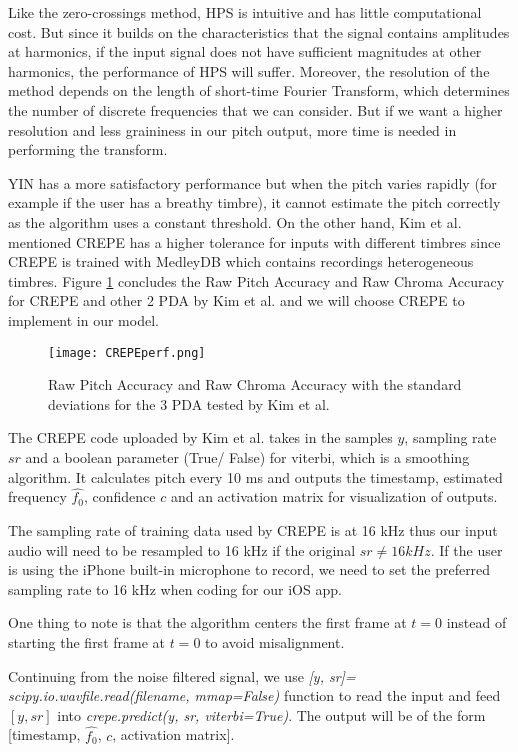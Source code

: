 Like the zero-crossings method, HPS is intuitive and has little computational cost. But since it builds on the characteristics 
that the signal contains amplitudes at harmonics, if the input signal does not have sufficient magnitudes at other harmonics, the 
performance of HPS will suffer. Moreover, the resolution of the method depends on the length of short-time Fourier Transform, which
determines the number of discrete frequencies that we can consider. But if we want a higher resolution and less graininess in our 
pitch output, more time is needed in performing the transform.

YIN has a more satisfactory performance but when the pitch varies rapidly (for example if the user has a breathy timbre), it cannot 
estimate the pitch correctly as the algorithm uses a constant threshold. On the other hand, Kim et al. mentioned CREPE has a higher 
tolerance for inputs with different timbres since CREPE is trained with MedleyDB which contains recordings heterogeneous timbres. Figure 
\ref{CREPEperf} concludes the Raw Pitch Accuracy and Raw Chroma Accuracy for CREPE and other 2 PDA by Kim et al. and we will choose CREPE 
to implement in our model.

\begin{figure}[h]
	\centering
	\texttt{[image: CREPEperf.png]}
	\caption{Raw Pitch Accuracy and Raw Chroma Accuracy with the standard deviations for the 3 PDA tested by Kim et al. }
	\label{CREPEperf}
\end{figure}

The CREPE code uploaded by Kim et al. takes in the samples $y$, sampling rate $sr$ and a boolean parameter (True/ False) for viterbi, which is a smoothing algorithm. 
It calculates pitch every 10 ms and outputs the timestamp, estimated frequency $\hat{f_0}$, confidence $c$ and an activation matrix for visualization of outputs. 

The sampling rate of training data used by CREPE is at 16 kHz thus our input audio will need to be resampled to 16 kHz if the original $sr \neq 16 kHz$. If the user is using the iPhone 
built-in microphone to record, we need to set the preferred sampling rate to 16 kHz  when coding for our iOS app.

One thing to note is that the algorithm centers the first frame at $t=0$ instead of starting the first frame at $t=0$ to avoid misalignment.

Continuing from the noise filtered signal, we use \emph{[y, sr]= scipy.io.wavfile.read(filename, mmap=False)} function to read the input and feed $[y, sr]$ 
into \emph{crepe.predict(y, sr, viterbi=True)}.
The output will be of the form [timestamp, $\hat{f_0}$, $c$, activation matrix].

